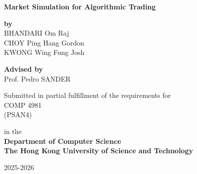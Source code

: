 \documentclass[12pt,a4paper]{article}
\begin{document}
\begin{titlepage}
\vspace*{\fill}
\begin{center}
\end{center}
\vspace*{\fill}
\end{titlepage}
\onehalfspacing
{}

\begin{titlepage}
    \begin{center}
        \vspace*{1cm}

        \Huge
        \textbf{Market Simulation for Algorithmic Trading}

        \vspace{1cm}

        \Large
        \textbf{by} \\
        \vspace{0.5cm}
        BHANDARI Om Raj \\
        CHOY Ping Hang Gordon \\
        KWONG Wing Fung Josh

        \vspace{1cm}

        \textbf{Advised by} \\
        \vspace{0.5cm}
        Prof. Pedro SANDER

        \vspace{1.5cm}

        \Large
        Submitted in partial fulfillment of the requirements for \\ COMP 4981
        \\(PSAN4)

        \vspace{0.5cm}

        \Large
        in the \\
        \textbf{Department of Computer Science} \\
        \textbf{The Hong Kong University of Science and Technology}

        \vfill

        \Large
        2025-2026

    \end{center}
\end{titlepage}
\end{document}
